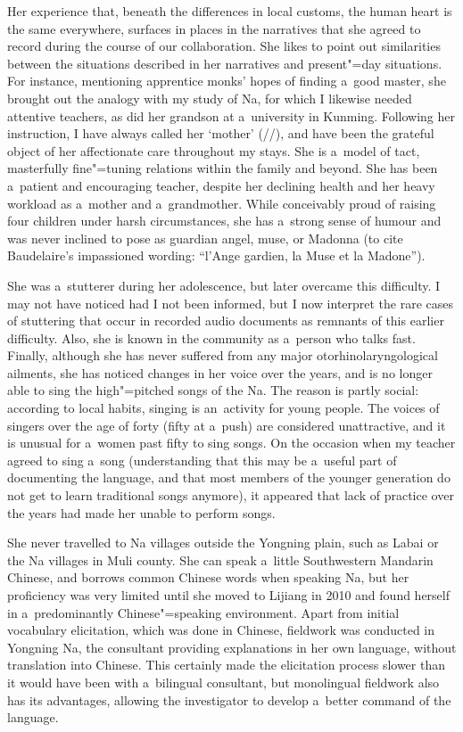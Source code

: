 Her experience that, beneath the differences in local customs, the human heart is the same everywhere, surfaces in places in the narratives that she agreed to record during the course of our
collaboration. She likes to point out similarities between the situations described in her
narratives and present"=day situations. For instance, mentioning apprentice monks’ hopes of finding
a~good master, she brought out the {analogy} with my study of Na, for which I likewise needed
attentive teachers, as did her grandson at a~university in Kunming. Following her instruction, I
have always called her ‘mother’ (//), and have been the grateful object of her affectionate care
throughout my stays. She is a~model of tact, masterfully fine"=tuning relations within the family and
beyond. She has been a~patient and encouraging teacher, despite her declining health and her heavy
workload as a~mother and a~grandmother. While conceivably proud of raising four children under harsh
circumstances, she has a~strong sense of humour and was never inclined to pose as guardian angel,
muse, or Madonna (to cite Baudelaire’s impassioned wording: “l’Ange gardien, la Muse et la Madone”).

\largerpage
She was a~stutterer during her adolescence, but later overcame this difficulty. I may not have
noticed had I not been informed, but I now interpret the rare cases of stuttering that occur in
recorded audio documents as remnants of this earlier difficulty. Also, she is known in the community
as a~person who talks fast. Finally, although she has never suffered from any major
otorhinolaryngological ailments, she has noticed changes in her voice over the years, and is no
longer able to sing the high"=pitched songs of the Na. The reason is partly social: according to
local habits, singing is an~activity for young people. The voices of singers over the age of forty (fifty at
a~push) are considered unattractive, and it is unusual for a~women past fifty to sing songs. On the
occasion when my teacher agreed to sing a~song (understanding that this may be a~useful part of
documenting the language, and that most members of the younger generation do not get to learn
traditional songs anymore), it appeared that lack of practice over the years had made her unable to
perform songs.

She never travelled to Na villages
outside the Yongning plain, such as Labai or the Na villages in Muli county. She can speak a~little
Southwestern Mandarin {Chinese}, and borrows common {Chinese} words when speaking Na, but
her proficiency was very limited until she moved to Lijiang in 2010 and found herself in
a~predominantly Chinese"=speaking environment. Apart from initial vocabulary elicitation, which
was done in Chinese, fieldwork was conducted in Yongning Na, the consultant providing explanations in her own
language, without translation into Chinese. This certainly made the elicitation process slower than
it would have been with a~bilingual consultant, but monolingual fieldwork also has its advantages,
allowing the investigator to develop a~better command of the language.

